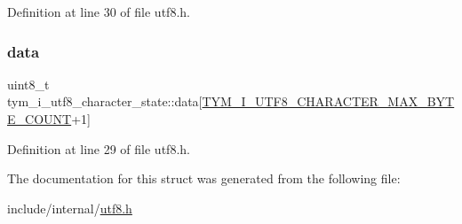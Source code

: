 Definition at line 30 of file utf8.\+h.

\mbox{\label{structtym__i__utf8__character__state_abf1a561ec12ca40c15493dd3a46cfc8b}} 
\subsubsection{\texorpdfstring{data}{data}}
{\footnotesize\ttfamily uint8\+\_\+t tym\+\_\+i\+\_\+utf8\+\_\+character\+\_\+state\+::data\mbox{[}\hyperlink{utf8_8h_abed82baf7f470b522273a3e37c24c600a1371d2f9f9df00dc4e1582bb74b59f3e}{T\+Y\+M\+\_\+\+I\+\_\+\+U\+T\+F8\+\_\+\+C\+H\+A\+R\+A\+C\+T\+E\+R\+\_\+\+M\+A\+X\+\_\+\+B\+Y\+T\+E\+\_\+\+C\+O\+U\+NT}+1\mbox{]}}



Definition at line 29 of file utf8.\+h.



The documentation for this struct was generated from the following file\+:\begin{DoxyCompactItemize}
\item 
include/internal/\hyperlink{utf8_8h}{utf8.\+h}\end{DoxyCompactItemize}
